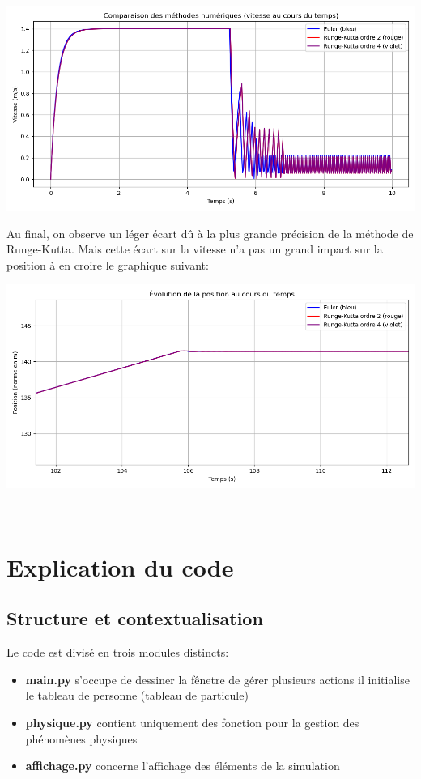 \documentclass[a4paper,12pt]{article}
\begin{document}
\includegraphics[width=\textwidth]{runge.png}

Au final, on observe un léger écart dû à la plus grande précision de la méthode de Runge-Kutta. Mais cette écart sur la vitesse n'a pas un grand impact sur la position à en croire le graphique suivant:

\includegraphics[width=\textwidth]{runge_pos.png}


\
\section{Explication du code}
\subsection{Structure et contextualisation}
\noindent Le code est divisé en trois modules distincts:
\begin{itemize}
	\item \textbf{main.py} s'occupe de dessiner la fênetre de gérer plusieurs actions il initialise le tableau de personne (tableau de particule)
	
	\item \textbf{physique.py} contient uniquement des fonction pour la gestion des phénomènes physiques

 	\item \textbf{affichage.py} concerne l'affichage des éléments de la simulation
\end{itemize}
\end{document}
